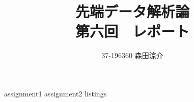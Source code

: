 \documentclass[dvipdfmx, fleqn, titlepage]{jsarticle}
\title{
	先端データ解析論 \\
	第六回　レポート
	}
\author{37-196360 \quad 森田涼介}
\begin{document}
\maketitle

{assignment1}
{assignment2}
\newpage
{listings}
\end{document}
